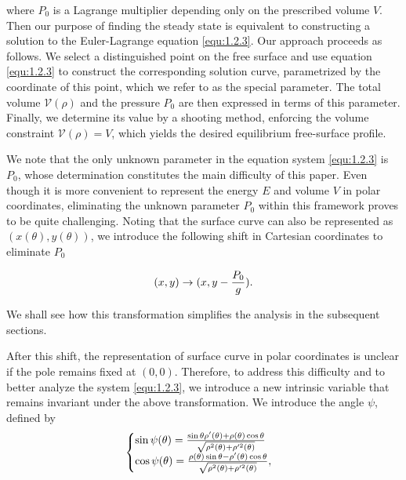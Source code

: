 \documentclass[letterpaper,reqno,10pt,twoside]{amsart}
\theoremstyle{definition}
\theoremstyle{remark}
\begin{document}
 \noindent where $P_{0}$ is a Lagrange multiplier depending only on the prescribed volume $V$. Then our purpose of finding the steady state is equivalent to constructing a solution to the Euler-Lagrange equation \eqref{equ:1.2.3}. Our approach proceeds as follows. We select a distinguished point on the free surface and use equation \eqref{equ:1.2.3} to construct the corresponding solution curve, parametrized by the coordinate of this point, which we refer to as the special parameter. The total volume $\mathcal{V}(\rho)$ and the pressure $P_{0}$ are then expressed in terms of this parameter. Finally, we determine its value by a shooting method, enforcing the volume constraint $\mathcal{V}(\rho)=V$, which yields the desired equilibrium free-surface profile.

We note that the only unknown parameter in the equation system \eqref{equ:1.2.3} is $P_{0}$, whose determination constitutes the main difficulty of this paper. Even though it is more convenient to  represent the energy $E$ and volume $V$ in polar coordinates, eliminating the unknown parameter $P_{0}$ within this framework proves to be quite challenging. Noting that the surface curve can also be represented as $(x(\theta),y(\theta))$,  we introduce the following shift in Cartesian coordinates to eliminate $P_{0}$

\begin{equation}{\label{equ:1.2.10}}
    (x,y)\rightarrow (x,y-\frac{P_{0}}{g}).
\end{equation}

\noindent We shall see how this transformation simplifies the analysis in the subsequent sections.  

After this shift, the representation of surface curve in polar coordinates is unclear if the pole remains fixed at $(0,0)$. Therefore, to address this difficulty and to better analyze the system \eqref{equ:1.2.3}, we introduce a new intrinsic variable that remains invariant under the above transformation. We introduce the angle $\psi$, defined by
    \begin{equation}{\label{def:slope}}
    \begin{cases}
    \sin\psi(\theta)=\frac{\sin\theta \rho'(\theta)+\rho(\theta)\cos\theta}{\sqrt{\rho^{2}(\theta)+\rho'^{2}(\theta)}}\\
    \cos\psi(\theta)=\frac{\rho(\theta)\sin\theta-\rho'(\theta)\cos\theta}{\sqrt{\rho^{2}(\theta)+\rho'^{2}(\theta)}},
    \end{cases}
    \end{equation}
\end{document}
